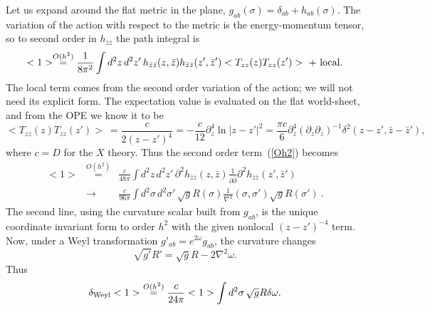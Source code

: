 Let us expand around the flat metric in
the plane, $ g_{ab}(\sigma) = \delta_{ab} + h_{ab}(\sigma)$.
The variation of the action with respect to the metric is the
energy-momentum tensor, so to second order in $h_{\bar z\bar z}$
the path integral is
\begin{equation}
<1> \stackrel{O(h^2)}{=}
\frac{1}{8\pi^2} \int d^2z\, d^2z'\, h_{\bar z\bar z}(z,\bar z)
h_{\bar z\bar z}(z', \bar z') 
< T_{zz}(z)  T_{zz}(z') >\ +\ {\rm local}. \label{Oh2}
\end{equation}
The local term comes from the second order variation of the action;
we will not need its explicit form.
The expectation value is evaluated on the flat world-sheet, 
and from the OPE we know it to be
\begin{equation}
< T_{zz}(z)  T_{zz}(z') >\ = \frac{c}{2(z - z')^4} =
-\frac{c}{12} \partial_z^4 \ln |z-z'|^2
= \frac{\pi c}{6}  \partial_z^4 (\partial_z \partial_{\bar
z})^{-1} 
\delta^2(z - z', \bar z - \bar z'),
\end{equation}
where $c=D$ for the $X$ theory.
Thus the second order term~(\ref{Oh2}) becomes
\begin{eqnarray}
<1>&\stackrel{O(h^2)}{=}&\frac{c}{48\pi} \int d^2z\,
d^2z'\, \partial^2 h_{\bar z\bar z}(z,\bar z) 
\frac{1}{\partial \bar \partial} \partial^2 h_{\bar
z\bar z}(z', \bar z') \nonumber\\
&\to & \frac{c}{96\pi} \int d^2\sigma\, d^2\sigma'\, 
\sqrt{ g} R(\sigma) \frac{1}{\nabla^2}(\sigma,\sigma') 
\sqrt{ g} R(\sigma')\ .  \label{liou}
\end{eqnarray}
The second line, using the
curvature scalar built from $g_{ab}$,
is the unique coordinate invariant form to order
$h^2$ with the given nonlocal $(z - z')^{-4}$ term.  Now, under a
Weyl transformation $g'_{ab} = e^{2\omega } g_{ab}$, the curvature
changes
\begin{equation}
\sqrt{g'}R' = \sqrt{g}R - 2\nabla^2 \omega. \label{Rweyl}
\end{equation}
Thus
\begin{equation}
\delta_{\rm Weyl} <1> 
\ \stackrel{O(h^2)}{=} \frac{c}{24\pi} <1> \int
d^2\sigma\,\sqrt{ g} R\delta\omega.
\label{weylan}
\end{equation}

